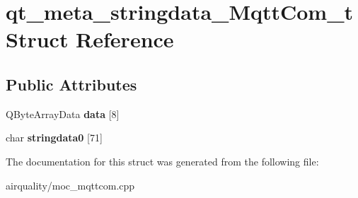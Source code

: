 \hypertarget{structqt__meta__stringdata__MqttCom__t}{}\section{qt\+\_\+meta\+\_\+stringdata\+\_\+\+Mqtt\+Com\+\_\+t Struct Reference}
\label{structqt__meta__stringdata__MqttCom__t}
\subsection*{Public Attributes}
\begin{DoxyCompactItemize}
\item 
\mbox{\label{structqt__meta__stringdata__MqttCom__t_a1e127e0a58fbc6a130e5a4b47e1f212f}} 
Q\+Byte\+Array\+Data {\bfseries data} \mbox{[}8\mbox{]}
\item 
\mbox{\label{structqt__meta__stringdata__MqttCom__t_ae960921df0246c74d2f2466e1b72153a}} 
char {\bfseries stringdata0} \mbox{[}71\mbox{]}
\end{DoxyCompactItemize}


The documentation for this struct was generated from the following file\+:\begin{DoxyCompactItemize}
\item 
airquality/moc\+\_\+mqttcom.\+cpp\end{DoxyCompactItemize}
